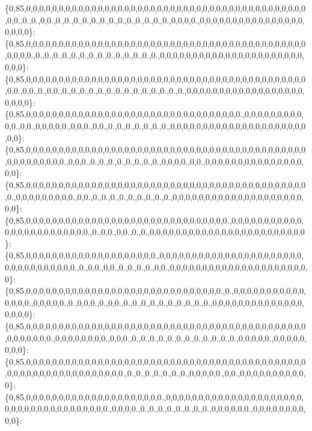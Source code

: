 \{0,85,0,0,0,0,0,0,0,0,0,0,0,0,0,0,0,0,0,0,0,0,0,0,0,0,0,0,0,0,0,0,0,0,0,0,0,0,0,0,0,0,0,0,0,0,0.,0.,0.,0,0.,0.,0.,0.,0.,0.,0.,0.,0.,0.,0.,0.,0.,0.,0,0,0,0.,0,0,0,0,0,0,0,0,0,0,0,0,0,0,0,0,0,0,0,0\}\+: \{0,85,0,0,0,0,0,0,0,0,0,0,0,0,0,0,0,0,0,0,0,0,0,0,0,0,0,0,0,0,0,0,0,0,0,0,0,0,0,0,0,0,0,0,0,0,0,0,0.,0.,0.,0.,0.,0.,0.,0.,0.,0.,0.,0.,0.,0.,0.,0,0,0,0,0,0,0,0,0,0,0,0,0,0,0,0,0,0,0,0,0,0,0,0,0\}\+: \{0,85,0,0,0,0,0,0,0,0,0,0,0,0,0,0,0,0,0,0,0,0,0,0,0,0,0,0,0,0,0,0,0,0,0,0,0,0,0,0,0,0,0,0,0,0,0.,0,0.,0.,0,0.,0.,0.,0.,0.,0.,0.,0.,0.,0.,0.,0.,0.,0.,0.,0,0,0,0,0,0,0,0,0,0,0,0,0,0,0,0,0,0,0,0,0,0\}\+: \{0,85,0,0,0,0,0,0,0,0,0,0,0,0,0,0,0,0,0,0,0,0,0,0,0,0,0,0,0,0,0,0,0,0,0.,0,0,0,0,0,0,0,0,0,0,0.,0,0.,0,0,0,0,0.,0,0,0.,0,0.,0.,0.,0.,0.,0.,0.,0.,0,0,0,0,0,0,0,0,0,0,0,0,0,0,0,0,0,0,0,0,0,0,0\}\+: \{0,85,0,0,0,0,0,0,0,0,0,0,0,0,0,0,0,0,0,0,0,0,0,0,0,0,0,0,0,0,0,0,0,0,0,0,0,0,0,0,0,0,0,0,0,0,0,0,0,0,0,0,0,0.,0,0,0.,0.,0.,0.,0.,0.,0.,0.,0.,0,0,0,0.,0,0.,0,0,0,0,0,0,0,0,0,0,0,0,0,0,0,0,0\}\+: \{0,85,0,0,0,0,0,0,0,0,0,0,0,0,0,0,0,0,0,0,0,0,0,0,0,0,0,0,0,0,0,0,0,0,0,0,0,0,0,0,0,0,0,0,0,0.,0,0,0,0,0,0,0,0,0.,0,0.,0.,0.,0.,0.,0.,0.,0.,0.,0.,0,0,0,0,0,0,0,0,0,0,0,0,0,0,0,0,0,0,0,0,0,0\}\+: \{0,85,0,0,0,0,0,0,0,0,0,0,0,0,0,0,0,0,0,0,0,0,0,0,0,0,0,0,0,0,0,0,0.,0,0,0,0,0,0,0,0,0,0,0,0,0,0,0,0,0,0,0,0,0,0,0,0.,0.,0,0.,0,0.,0.,0.,0,0,0,0,0,0,0,0,0,0,0,0,0,0,0,0,0,0,0,0,0,0,0,0\}\+: \{0,85,0,0,0,0,0,0,0,0,0,0,0,0,0,0,0,0,0,0,0,0.,0,0,0,0,0,0,0,0,0,0,0,0,0,0,0,0,0,0,0,0,0,0,0,0,0,0,0,0,0,0,0,0,0.,0.,0,0.,0,0.,0.,0.,0.,0.,0,0.,0,0,0,0,0,0,0,0,0,0,0,0,0,0,0,0,0,0,0,0,0,0\}\+: \{0,85,0,0,0,0,0,0,0,0,0,0,0,0,0,0,0,0,0,0,0,0,0,0,0,0,0,0,0,0,0,0.,0.,0,0,0,0,0,0,0,0,0,0,0,0,0,0,0.,0,0,0,0,0.,0.,0,0,0.,0.,0,0.,0.,0.,0.,0.,0.,0.,0.,0.,0.,0.,0,0,0,0,0,0,0,0,0,0,0,0,0,0,0,0,0,0\}\+: \{0,85,0,0,0,0,0,0,0,0,0,0,0,0,0,0,0,0,0,0,0,0,0,0,0,0,0,0,0,0,0,0,0,0,0,0,0,0,0,0,0,0,0,0,0,0,0,0,0,0,0,0.,0,0,0,0,0,0,0,0.,0,0,0.,0.,0.,0.,0.,0.,0.,0.,0.,0.,0.,0.,0.,0,0,0,0,0.,0,0,0,0,0,0,0,0\}\+: \{0,85,0,0,0,0,0,0,0,0,0,0,0,0,0,0,0,0,0,0,0,0,0,0,0,0,0,0,0,0,0,0,0,0,0,0,0,0,0,0,0,0,0,0,0,0,0,0,0,0,0,0,0,0,0,0,0,0,0,0,0,0,0.,0.,0.,0.,0.,0.,0.,0.,0,0,0,0,0.,0,0.,0,0,0,0,0,0,0,0,0,0,0\}\+: \{0,85,0,0,0,0,0,0,0,0,0,0,0,0,0,0,0,0,0,0,0,0,0.,0,0,0,0,0,0,0,0,0,0,0,0,0,0,0,0,0,0,0,0,0,0,0,0,0,0,0,0,0,0,0,0,0,0,0,0,0.,0,0,0,0.,0.,0.,0.,0.,0.,0.,0.,0.,0,0,0,0,0,0.,0,0,0,0,0,0,0,0,0,0\}\+: 
